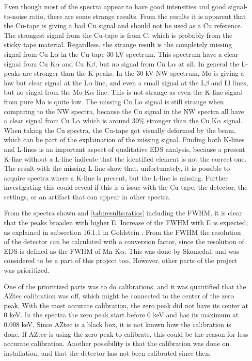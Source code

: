 Even though most of the spectra appear to have good intensities and good signal-to-noise ratio, there are some strange results.
From the results it is apparent that the Cu-tape is giving a bad Cu signal and should not be used as a Cu reference.
The strongest signal from the Cu-tape is from C, which is probably from the sticky tape material.
Regardless, the strange result is the completely missing signal from Cu L$\alpha$ in the Cu-tape 30 kV spectrum.
This spectrum have a clear signal from Cu K$\alpha$ and Cu K$\beta$, but no signal from Cu L$\alpha$ at all.
In general the L-peaks are stronger than the K-peaks.
In the 30 kV NW spectrum, Mo is giving a low but clear signal at the L$\alpha$ line, and even a small signal at the L$\beta$ and Ll lines, but no singal from the Mo K$\alpha$ line.
This is not strange as even the K-line signal from pure Mo is quite low.
The missing Cu L$\alpha$ signal is still strange when comparing to the NW spectra, because the Cu signal in the NW spectra all have a clear signal from Cu L$\alpha$ which is around 30\% stronger than the Cu K$\alpha$ signal.
When taking the Cu spectra, the Cu-tape got visually deformed by the beam, which can be part of the explaination of the missing signal.
Finding both K-lines and L-lines is an important aspect of qualitative EDS analysis, because a present K-line without a L-line indicate that the identified element is not the correct one.
The result with the missing L-line show that, unfortunately, it is possible to acquire spectra where a K-line is present, but the L-line is missing.
Further investigating this could reveal if this is a issue with the Cu-tape, the detector, the settings, or an artifact that can appear in other spectra.


From the spectra shown and \cref{tab:results:ratios} including the FWHM, it is clear that the peaks broaden with higher E.
Increase of the FWHM with E is expected, as explained in subsection 16.1.1 in Goldstein \cite{goldstein_scanning_2018}.
From the FWHM the resolution of the detector can be calculated with a conversion factor, since the resolution of EDS is defined as the FWHM of Mn K$\alpha$.
This was done by Skomedal, and was considered to be a part of this project too.
However, other parts of the project was prioritized.


One of the prioritized parts was to do calibrations, and it was quantified that the AZtec calibration was off, which might be connected to the center of the zero peak.
With the most accurate calibration, the zero peak did not have its center at 0 keV.
In the spectra the zero peak start before 0 keV and has its maximum at 0.008 keV.
Since AZtec is a black box, it is not known how the calibration is done.
If AZtec is using the zero peak to calibrate, this could be the reason for less accurate calibration.
Another possibility is that the calibration was done on installation, and that the detector has not been calibrated since then.


